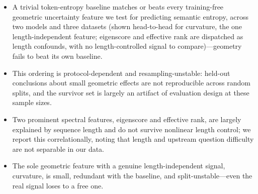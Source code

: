 \documentclass[11pt]{article}
\begin{document}
\begin{itemize}
\item[\textbf{(C-B)}] A trivial token-entropy baseline matches or beats every training-free geometric uncertainty feature we test for predicting semantic entropy, across two models and three datasets (shown head-to-head for curvature, the one length-independent feature; eigenscore and effective rank are dispatched as length confounds, with no length-controlled signal to compare)---geometry fails to beat its own baseline.
\item[\textbf{(C-C)}] This ordering is protocol-dependent and resampling-unstable: held-out conclusions about small geometric effects are not reproducible across random splits, and the survivor set is largely an artifact of evaluation design at these sample sizes.
\item[\textbf{(C-A)}] Two prominent spectral features, eigenscore and effective rank, are largely explained by sequence length and do not survive nonlinear length control; we report this correlationally, noting that length and upstream question difficulty are not separable in our data.
\item[\textbf{(C-D)}] The sole geometric feature with a genuine length-independent signal, curvature, is small, redundant with the baseline, and split-unstable---even the real signal loses to a free one.
\end{itemize}
\end{document}
